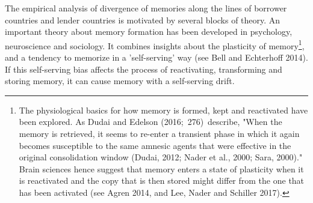 The empirical analysis of divergence of memories along the lines of borrower
countries and lender countries is motivated by several blocks of
theory. An important theory about memory formation has been developed in
psychology, neuroscience and sociology. It combines insights about the
plasticity of memory\footnote{%
The physiological basics for how memory is formed, kept and reactivated have
been explored. As Dudai and Edelson (2016;\ 276)\ describe, "When the memory
is retrieved, it seems to re-enter a transient phase in which it again
becomes susceptible to the same amnesic agents that were effective in the
original consolidation window (Dudai, 2012; Nader et al., 2000; Sara,
2000)." Brain sciences hence suggest that memory enters a state of
plasticity when it is reactivated and the copy that is then stored might
differ from the one that has been activated (see Agren 2014, and Lee, Nader
and Schiller 2017).}, and a tendency to memorize in a 'self-serving' way
(see Bell and Echterhoff 2014). If this self-serving bias affects the
process of reactivating, transforming and storing memory, it can cause
memory with a self-serving drift.

